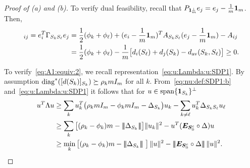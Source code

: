 

\begin{proof}[Proof of (a) and (b)]
  To verify dual feasibility, recall that $P_{\bm{1}_m^\perp} e_j = e_j - \frac1m \bm{1}_m$. Then,
  \begin{align*}
    [\Gamma_{\subb{k}\subb{\ell}}]_{ij} 
    = e_i^T \Gamma_{\subb{k}\subb{\ell}} e_j 
    &=  \frac12(\mubar_k + \mubar_\ell) + (e_i - \frac1m \onev_m)^T A_{\subb{k}\subb{\ell}} (e_j - \frac1m \onev_m) - A_{ij}  \\
    &=  \frac12(\mubar_k + \mubar_\ell)   - \frac1{m} \big[\dg{i}{\ell}  + \dg{j}{k} - \dav{k}\ell \big] \ge 0.
  \end{align*}
    
  To verify~\eqref{eq:A1:equiv:2}, we recall representation~\eqref{eq:u:Lambda:u:SDP1}. By assumption $ \operatorname{diag}^*([d(S_{k})]_{S_{k}}) \succeq \rho_k m I_m$ for all $k$. From~\eqref{eq:nu:def:SDP1:b} and~\eqref{eq:u:Lambda:u:SDP1} it follows that for $u \in \operatorname{span}\{\bm{1}_{S_k}\}^\perp$
  \begin{align*}
    u^T \Lambda u &\ge 
    \sum_k u_k^T\big(\rho_k m I_m - \mubar_k m I_m - \Delta_{\subb{k}} \big) u_k 
    -\sum_{k \neq \ell} u_k^T \Delta_{\subb{k} \subb{\ell}} u_\ell \\
     &\ge \sum_k \big[ (\rho_k - \mubar_k)m - \mnorm{\Delta_{\subb{k}}} \big]\vnorm{u_k}^2 
     -  u^T (\onem_{\Stru^c} \circ \Delta) u\\ 
      &\ge \min_k \big[(\rho_k - \mubar_k) m - \mnorm{\Delta_{\subb{k}}}\ \big] \,\|u\|^2 - \mnorm{\onem_{\Stru^c} \circ \Delta} \,\|u\|^2.
  \end{align*}
\vspace{-4ex}

  \end{proof}



